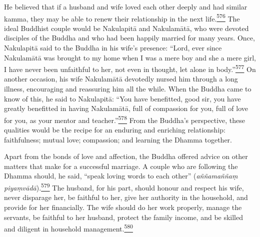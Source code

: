He believed that if a husband and wife loved each other deeply and had
similar kamma, they may be able to renew their relationship in the next
life.\label{footprints_split_015.html_fnref576}\hyperref[footprints_split_025.htmlux5cux23fn576]{\textsuperscript{576}}
The ideal Buddhist couple would be Nakulapitā and Nakulamātā, who were
devoted disciples of the Buddha and who had been happily married for
many years. Once, Nakulapitā said to the Buddha in his wife's presence:
``Lord, ever since Nakulamātā was brought to my home when I was a mere
boy and she a mere girl, I have never been unfaithful to her, not even
in thought, let alone in
body.''\label{footprints_split_015.html_fnref577}\hyperref[footprints_split_025.htmlux5cux23fn577]{\textsuperscript{577}}
On another occasion, his wife Nakulamātā devotedly nursed him through a
long illness, encouraging and reassuring him all the while. When the
Buddha came to know of this, he said to Nakulapitā: ``You have
benefitted, good sir, you have greatly benefitted in having Nakulamātā,
full of compassion for you, full of love for you, as your mentor and
teacher.''\label{footprints_split_015.html_fnref578}\hyperref[footprints_split_025.htmlux5cux23fn578]{\textsuperscript{578}}
From the Buddha's perspective, these qualities would be the recipe for
an enduring and enriching relationship: faithfulness; mutual love;
compassion; and learning the Dhamma together.

Apart from the bonds of love and affection, the Buddha offered advice on
other matters that make for a successful marriage. A couple who are
following the Dhamma should, he said, ``speak loving words to each
other'' (\emph{aññamaññaṃ
piyaṃvādā}).\label{footprints_split_015.html_fnref579}\hyperref[footprints_split_025.htmlux5cux23fn579]{\textsuperscript{579}}
The husband, for his part, should honour and respect his wife, never
disparage her, be faithful to her, give her authority in the household,
and provide for her financially. The wife should do her work properly,
manage the servants, be faithful to her husband, protect the family
income, and be skilled and diligent in household
management.\label{footprints_split_015.html_fnref580}\hyperref[footprints_split_025.htmlux5cux23fn580]{\textsuperscript{580}}

